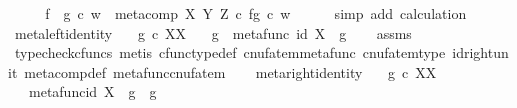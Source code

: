 \begin{isabellebody}
\ \ \isamarkupfalse%
\ \isamarkupfalse%
\ {\isachardoublequoteopen}{\isacharparenleft}{\kern0pt}f\ {\isasymbox}\ g{\isacharparenright}{\kern0pt}\ {\isasymcirc}\isactrlsub c\ w\ {\isacharequal}{\kern0pt}\ {\isacharparenleft}{\kern0pt}meta{\isacharunderscore}{\kern0pt}comp\ X\ Y\ Z\ {\isasymcirc}\isactrlsub c\ {\isasymlangle}f{\isacharcomma}{\kern0pt}g{\isasymrangle}{\isacharparenright}{\kern0pt}\ {\isasymcirc}\isactrlsub c\ w{\isachardoublequoteclose}\isanewline
\ \ \ \ \isamarkupfalse%
\ {\isacharparenleft}{\kern0pt}simp\ add{\isacharcolon}{\kern0pt}\ calculation{\isacharparenright}{\kern0pt}\isanewline
{}\isamarkupfalse%
%
\endisatagproof
{\isafoldproof}%
%
\isadelimproof
\isanewline
%
\endisadelimproof
\isanewline
{}\isamarkupfalse%
\ meta{\isacharunderscore}{\kern0pt}left{\isacharunderscore}{\kern0pt}identity{\isacharcolon}{\kern0pt}\isanewline
\ \ \ {\isachardoublequoteopen}g\ {\isasymin}\isactrlsub c\ X\isactrlbsup X\isactrlesup {\isachardoublequoteclose}\isanewline
\ \ \ {\isachardoublequoteopen}g\ {\isasymbox}\ metafunc\ {\isacharparenleft}{\kern0pt}id\ X{\isacharparenright}{\kern0pt}\ {\isacharequal}{\kern0pt}\ g{\isachardoublequoteclose}\isanewline
%
\isadelimproof
\ \ %
\endisadelimproof
%
\isatagproof
{}\isamarkupfalse%
\ assms\ \isamarkupfalse%
\ {\isacharparenleft}{\kern0pt}typecheck{\isacharunderscore}{\kern0pt}cfuncs{\isacharcomma}{\kern0pt}\ metis\ cfunc{\isacharunderscore}{\kern0pt}type{\isacharunderscore}{\kern0pt}def\ cnufatem{\isacharunderscore}{\kern0pt}metafunc\ cnufatem{\isacharunderscore}{\kern0pt}type\ id{\isacharunderscore}{\kern0pt}right{\isacharunderscore}{\kern0pt}unit\ meta{\isacharunderscore}{\kern0pt}comp{}{\isacharunderscore}{\kern0pt}def{}\ metafunc{\isacharunderscore}{\kern0pt}cnufatem{\isacharparenright}{\kern0pt}%
\endisatagproof
{\isafoldproof}%
%
\isadelimproof
\isanewline
%
\endisadelimproof
\ \ \isanewline
{}\isamarkupfalse%
\ meta{\isacharunderscore}{\kern0pt}right{\isacharunderscore}{\kern0pt}identity{\isacharcolon}{\kern0pt}\isanewline
\ \ \ {\isachardoublequoteopen}g\ {\isasymin}\isactrlsub c\ X\isactrlbsup X\isactrlesup {\isachardoublequoteclose}\isanewline
\ \ \ {\isachardoublequoteopen}metafunc{\isacharparenleft}{\kern0pt}id\ X{\isacharparenright}{\kern0pt}\ {\isasymbox}\ g\ {\isacharequal}{\kern0pt}\ g{\isachardoublequoteclose}\isanewline
%
\isadelimproof
\ \ %
\endisadelimproof
%
\isatagproof

\end{isabellebody}
